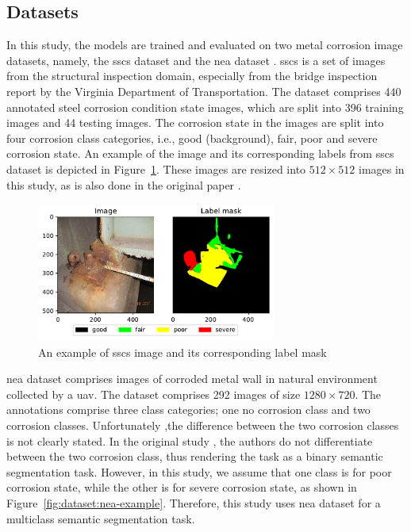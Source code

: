 \documentclass[mathematics,article,submit,pdftex,moreauthors]{Definitions/mdpi}
\begin{document}
\subsection{Datasets}
In this study, the models are trained and evaluated on two metal corrosion image
datasets, namely, the \ac{sscs} dataset \cite{Bianchi2021Dataset,Bianchi2022Journal} and 
the \ac{nea} dataset \cite{Liu2023}. \ac{sscs} is a set of 
images from the structural inspection domain,
especially from the bridge inspection report 
by the Virginia Department of Transportation. 
The dataset comprises 440 annotated steel corrosion condition state images,
which are split into 396 training images and 44 testing images.
The corrosion state in the images are split into four corrosion
class categories, i.e., good (background), fair, poor and severe corrosion state.
An example of the image and its corresponding labels
from \ac{sscs} dataset is depicted in Figure~\ref{fig:dataset:ccsc-example}.
These images are resized into $512\times 512$ images in this study, as is also done
in the original paper \cite{Bianchi2022Journal}.

\begin{figure}[htbp]
    \begin{center}
    \includegraphics[width=0.7\textwidth]{figures/ccsc-example.pdf}
    \caption{An example of \ac{sscs} image and its corresponding label mask}
    \label{fig:dataset:ccsc-example}
    \end{center}
\end{figure}

\ac{nea} dataset comprises images of corroded metal wall
in natural environment collected by a \ac{uav}.
The dataset comprises 292 images of size $1280\times 720$.
The annotations comprise three class categories; one no corrosion class
and two corrosion classes. Unfortunately ,the difference
between the two corrosion classes is not clearly stated. 
In the original study \cite{Liu2023}, the authors
do not differentiate between the two corrosion class,
thus rendering the task as a binary semantic segmentation
task. However, in this study, 
we assume that one class is for poor corrosion state, 
while the other is for severe corrosion state, as shown
in Figure~\ref{fig:dataset:nea-example}. Therefore,
this study uses \ac{nea} dataset for a multiclass semantic
segmentation task.
\end{document}
